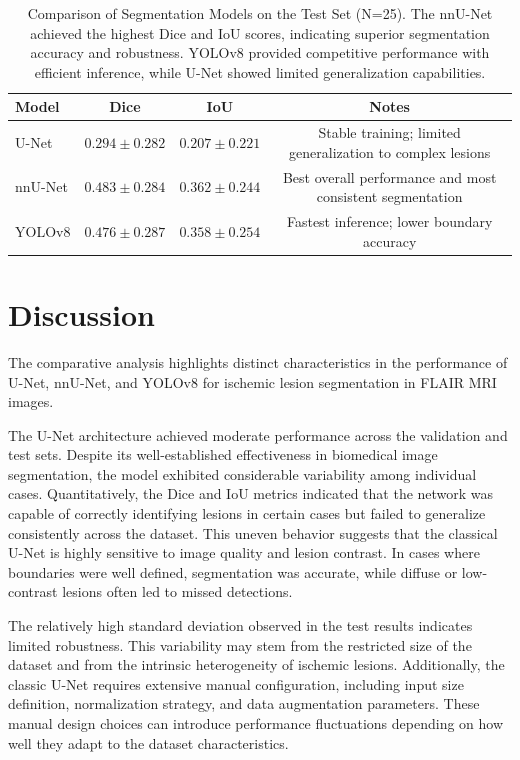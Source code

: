 \documentclass[12pt]{article}
\begin{document}
\begin{table}[h]
\centering
\begin{tabular}{lccc}
\toprule
\textbf{Model} & \textbf{Dice} & \textbf{IoU} & \textbf{Notes} \\
\midrule
U-Net & $0.294 \pm 0.282$ & $0.207 \pm 0.221$ & Stable training; limited generalization to complex lesions \\
nnU-Net & $0.483 \pm 0.284$ & $0.362 \pm 0.244$ & Best overall performance and most consistent segmentation \\
YOLOv8 & $0.476 \pm 0.287$ & $0.358 \pm 0.254$ & Fastest inference; lower boundary accuracy \\
\bottomrule
\end{tabular}
\caption{Comparison of Segmentation Models on the Test Set (N=25). The nnU-Net achieved the highest Dice and IoU scores, indicating superior segmentation accuracy and robustness. YOLOv8 provided competitive performance with efficient inference, while U-Net showed limited generalization capabilities.}
\label{tab:comparison}
\end{table}

\section{Discussion} \label{sec:discussion}


The comparative analysis highlights distinct characteristics in the performance of U-Net, nnU-Net, and YOLOv8 for ischemic lesion segmentation in FLAIR MRI images.

The U-Net architecture achieved moderate performance across the validation and test sets. Despite its well-established effectiveness in biomedical image segmentation, the model exhibited considerable variability among individual cases. Quantitatively, the Dice and IoU metrics indicated that the network was capable of correctly identifying lesions in certain cases but failed to generalize consistently across the dataset. This uneven behavior suggests that the classical U-Net is highly sensitive to image quality and lesion contrast. In cases where boundaries were well defined, segmentation was accurate, while diffuse or low-contrast lesions often led to missed detections.

The relatively high standard deviation observed in the test results indicates limited robustness. This variability may stem from the restricted size of the dataset and from the intrinsic heterogeneity of ischemic lesions. Additionally, the classic U-Net requires extensive manual configuration, including input size definition, normalization strategy, and data augmentation parameters. These manual design choices can introduce performance fluctuations depending on how well they adapt to the dataset characteristics.
\end{document}
